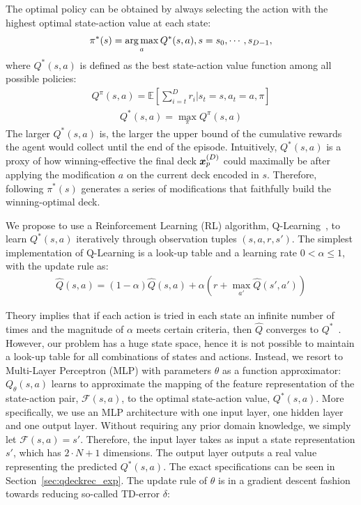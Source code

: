The optimal policy can be obtained by always selecting the action with the highest optimal state-action value at each state:
\begin{align}
    \pi^*(s) = \operatorname*{arg\,max}_a Q^*(s,a),  s = s_0, \cdots, s_{D-1},
\label{eqn:optpolicy}
\end{align}
where $Q^*(s,a)$ is defined as the best state-action value function among all possible policies:
\begin{align}
Q^\pi(s,a)=\mathbb{E}[\sum_{i=t}^{D} r_i | s_t=s, a_t=a, \pi] 
\end{align}
\begin{align}
Q^*(s,a)=\max_\pi Q^\pi(s,a) 
\end{align}
The larger $Q^*(s,a)$ is, the larger the upper bound of the cumulative rewards the agent would collect until the end of the episode. Intuitively, $Q^*(s,a)$ is a proxy of how winning-effective the final deck $\boldsymbol{x}_p^{(D)}$ could maximally be after applying the modification $a$ on the current deck encoded in $s$. Therefore, following $\pi^*(s)$ generates a series of modifications that faithfully build the winning-optimal deck. 

We propose to use a Reinforcement Learning (RL) algorithm, Q-Learning~\citep{watkins1992q}, to learn $Q^*(s,a)$ iteratively through observation tuples $(s,a,r,s')$. The simplest implementation of Q-Learning is a look-up table and a learning rate $0 < \alpha \leq 1$, with the update rule as: 
\begin{align}
\hat{Q}(s,a) = (1 - \alpha) \hat{Q}(s,a) + \alpha (r + \max_{a'} \hat{Q}(s', a')) 
\label{eqn:qsa}
\end{align}

Theory implies that if each action is tried in each state an infinite number of times and the magnitude of $\alpha$ meets certain criteria, then $\hat{Q}$ converges to $Q^*$~\cite{bertsekas1989parallel}. However, our problem has a huge state space, hence it is not possible to maintain a look-up table for all combinations of states and actions. Instead, we resort to Multi-Layer Perceptron (MLP) with parameters $\theta$ as a function approximator: $Q_\theta(s,a)$ learns to approximate the mapping of the feature representation of the state-action pair, $\mathcal{F}(s,a)$, to the optimal state-action value, $Q^*(s,a)$. More specifically, we use an MLP architecture with one input layer, one hidden layer and one output layer. Without requiring any prior domain knowledge, we simply let $\mathcal{F}(s,a)=s'$. Therefore, the input layer takes as input a state representation $s'$, which has ${2\cdot N+1}$ dimensions. The output layer outputs a real value  representing the predicted $Q^*(s,a)$. The exact specifications can be seen in Section~\ref{sec:qdeckrec_exp}. The update rule of $\theta$ is in a gradient descent fashion towards reducing so-called TD-error $\delta$:

